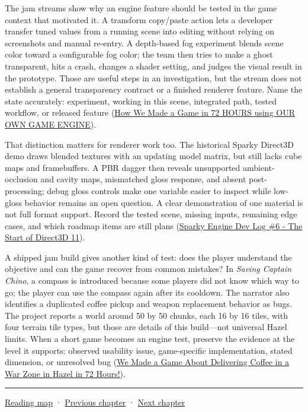 The jam streams show why an engine feature should be tested in the game context that motivated it. A transform copy/paste action lets a developer transfer tuned values from a running scene into editing without relying on screenshots and manual re-entry. A depth-based fog experiment blends scene color toward a configurable fog color; the team then tries to make a ghost transparent, hits a crash, changes a shader setting, and judges the visual result in the prototype. Those are useful steps in an investigation, but the stream does not establish a general transparency contract or a finished renderer feature. Name the state accurately: experiment, working in this scene, integrated path, tested workflow, or released feature (\href{https://www.youtube.com/watch?v=tQ_pjZDfm-0&t=1m10s}{How We Made a Game in 72 HOURS using OUR OWN GAME ENGINE}).

That distinction matters for renderer work too. The historical Sparky Direct3D demo draws blended textures with an updating model matrix, but still lacks cube maps and framebuffers. A PBR dagger then reveals unsupported ambient-occlusion and cavity maps, mismatched gloss response, and absent post-processing; debug gloss controls make one variable easier to inspect while low-gloss behavior remains an open question. A clear demonstration of one material is not full format support. Record the tested scene, missing inputs, remaining edge cases, and which roadmap items are still plans (\href{https://www.youtube.com/watch?v=AsNE-eGmGxs&t=7m34s}{Sparky Engine Dev Log \#6 - The Start of Direct3D 11}).

A shipped jam build gives another kind of test: does the player understand the objective and can the game recover from common mistakes? In \emph{Saving Captain Chino}, a compass is introduced because some players did not know which way to go; the player can use the compass again after its cooldown. The narrator also identifies a duplicated coffee pickup and weapon replacement behavior as bugs. The project reports a world around 50 by 50 chunks, each 16 by 16 tiles, with four terrain tile types, but those are details of this build---not universal Hazel limits. When a short game becomes an engine test, preserve the evidence at the level it supports: observed usability issue, game-specific implementation, stated dimension, or unresolved bug (\href{https://www.youtube.com/watch?v=ahrdtYwBLTk&t=2m10s}{We Made a Game About Delivering Coffee in a War Zone in Hazel in 72 Hours!}).

\begin{center}\rule{0.5\linewidth}{0.5pt}\end{center}

\hyperref[volume-reading-map]{Reading map} · \hyperref[06-engine-ii-ch039-composable-timesteps-and-stable-simulation-policy]{Previous chapter} · \hyperref[06-engine-ii-ch041-evidence-tools-and-revisable-design]{Next chapter}

